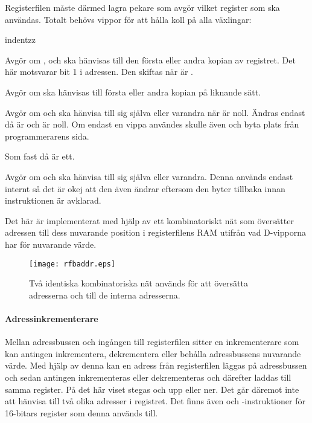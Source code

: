 \documentclass[main.tex]{subfiles}
\begin{document}
Registerfilen måste därmed lagra pekare som avgör vilket register som ska
användas. Totalt behövs vippor för att hålla koll på alla växlingar:
\begin{labeling}{indentzz}
\item[\mono{reg}]
    Avgör om ,  och  ska hänvisas till den första
    eller andra kopian av registret. Det här motsvarar bit 1 i adressen. Den
    skiftas när  är .
\item[\mono{af}]
    Avgör om  ska hänvisas till första eller andra kopian på liknande
    sätt.
\item[\mono{dehl0}]
    Avgör om  och  ska hänvisa till sig själva eller varandra
    när  är noll. Ändras endast då  är  och
     är noll. Om endast en vippa användes skulle även  och
     byta plats från programmerarens sida.
\item[\mono{dehl1}]
    Som  fast då  är ett.
\item[\mono{afwz}]
    Avgör om  och  ska hänvisa till sig själva eller
    varandra. Denna används endast internt så det är okej att den även ändrar
     eftersom den byter tillbaka innan instruktionen är avklarad.
\end{labeling}

Det här är implementerat med hjälp av ett kombinatoriskt nät som översätter
adressen till dess nuvarande position i registerfilens RAM utifrån vad
D-vipporna har för nuvarande värde.

\begin{SCfigure}
    \centering
    \texttt{[image: rfbaddr.eps]}
    \caption{Två identiska kombinatoriska nät används för att översätta
    adresserna  och  till de interna adresserna.}
    \label{fig:rfbaddr}
\end{SCfigure}

\paragraph{Adressinkrementerare}
Mellan adressbussen och ingången till registerfilen sitter en inkrementerare
som kan antingen inkrementera, dekrementera eller behålla adressbussens
nuvarande värde. Med hjälp av denna kan en adress från registerfilen läggas på
adressbussen och sedan antingen inkrementeras eller dekrementeras och därefter
laddas till samma register. På det här viset stegas  och  upp
eller ner. Det går däremot inte att hänvisa till två olika adresser i
registret. Det finns även  och -instruktioner för 16-bitars
register som denna används till.
\end{document}
